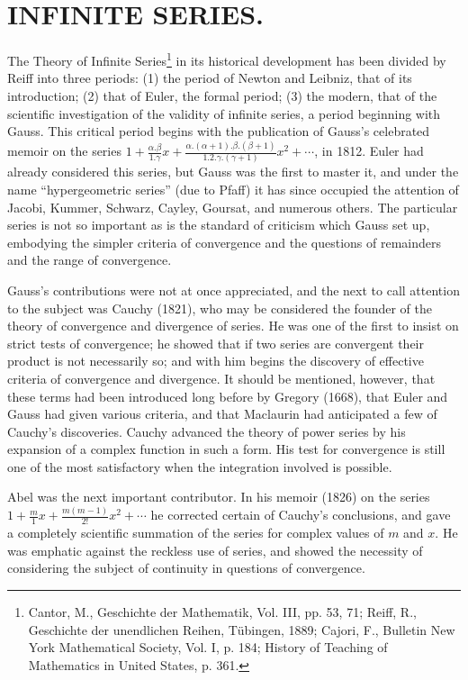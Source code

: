 \documentclass[oneside]{book}
\begin{document}
{\chapter{INFINITE SERIES.}

The Theory of Infinite Series\footnote{Cantor, M., Geschichte der
Mathematik, Vol. III, pp. 53, 71; Reiff, R., Geschichte der
unendlichen Reihen, T\"ubingen, 1889; Cajori, F., Bulletin New York
Mathematical Society, Vol. I, p. 184; History of Teaching of
Mathematics in United States, p. 361.} in its historical
development has been divided by Reiff into three periods: (1) the
period of Newton and Leibniz, that of its introduction; (2) that of
Euler, the formal period; (3) the modern, that of the scientific
investigation of the validity of infinite series, a period beginning
with Gauss. This critical period begins with the publication of
Gauss's celebrated memoir on the series $1 +
\frac{\alpha.\beta}{1.\gamma}x +
\frac{\alpha.(\alpha+1).\beta.(\beta+1)}{1.2.\gamma.(\gamma+1)}x^2 +
\cdots$, in 1812. Euler had already considered this series, but Gauss
was the first to master it, and under the name ``hypergeometric
series'' (due to Pfaff) it has since occupied the attention of
Jacobi, Kummer, Schwarz, Cayley, Goursat, and numerous others. The
particular series is not so important as is the standard of
criticism which Gauss set up, embodying the simpler criteria of
convergence and the questions of remainders and the range of
convergence.

Gauss's contributions were not at once appreciated, and the next to
call attention to the subject was Cauchy (1821), who may be
considered the founder of the theory of convergence and divergence
of series. He was one of the first to insist on strict tests of
convergence; he showed that if two series are convergent their
product is not necessarily so; and with him begins the discovery of
effective criteria of convergence and divergence. It should be
mentioned, however, that these terms had been introduced long before
by Gregory (1668), that Euler and Gauss had given various criteria,
and that Maclaurin had anticipated a few of Cauchy's discoveries.
Cauchy advanced the theory of power series by his expansion of a
complex function in such a form. His test for convergence is still
one of the most satisfactory when the integration involved is
possible.

Abel was the next important contributor. In his memoir (1826) on the
series $1 + \frac{m}{1}x + \frac{m(m-1)}{2!}x^2 + \cdots$ he
corrected certain of Cauchy's conclusions, and gave a completely
scientific summation of the series for complex values of $m$ and $x$.
He was emphatic against the reckless use of series, and showed the
necessity of considering the subject of continuity in questions of
convergence.

}
\end{document}
